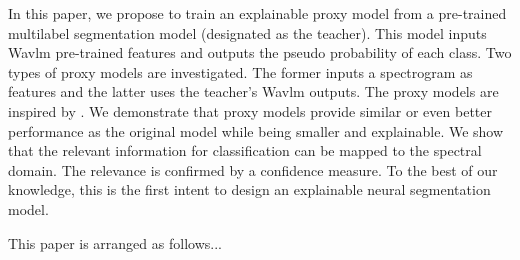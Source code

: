 In this paper, we propose to train an explainable proxy model from a pre-trained multilabel segmentation model (designated as the teacher).
This model inputs Wavlm pre-trained features and outputs the pseudo probability of each class.
Two types of proxy models are investigated.
The former inputs a spectrogram as features and the latter uses the teacher's Wavlm outputs.
The proxy models are inspired by \cite{parekh2023tackling}.
We demonstrate that proxy models provide similar or even better performance as the original model while being smaller and explainable.
We show that the relevant information for classification can be mapped to the spectral domain.
The relevance is confirmed by a confidence measure.
To the best of our knowledge, this is the first intent to design an explainable neural segmentation model.  

This paper is arranged as follows...









